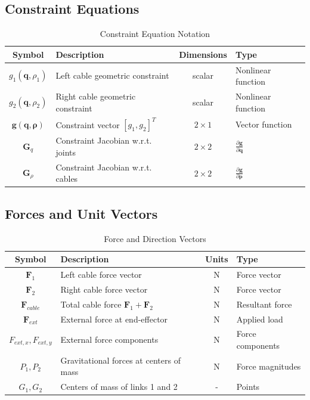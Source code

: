 \subsection{Constraint Equations}

\begin{table}[h!]
\centering
\caption{Constraint Equation Notation}
\begin{tabular}{|c|l|c|l|}
\hline
\textbf{Symbol} & \textbf{Description} & \textbf{Dimensions} & \textbf{Type} \\
\hline
$g_1(\bm{q}, \rho_1)$ & Left cable geometric constraint & scalar & Nonlinear function \\
$g_2(\bm{q}, \rho_2)$ & Right cable geometric constraint & scalar & Nonlinear function \\
$\bm{g}(\bm{q}, \bm{\rho})$ & Constraint vector $[g_1, g_2]^T$ & $2 \times 1$ & Vector function \\
$\bm{G}_q$ & Constraint Jacobian w.r.t. joints & $2 \times 2$ & $\frac{\partial \bm{g}}{\partial \bm{q}}$ \\
$\bm{G}_{\rho}$ & Constraint Jacobian w.r.t. cables & $2 \times 2$ & $\frac{\partial \bm{g}}{\partial \bm{\rho}}$ \\
\hline
\end{tabular}
\end{table}

\subsection{Forces and Unit Vectors}

\begin{table}[h!]
\centering
\caption{Force and Direction Vectors}
\begin{tabular}{|c|l|c|l|}
\hline
\textbf{Symbol} & \textbf{Description} & \textbf{Units} & \textbf{Type} \\
\hline
$\bm{F}_1$ & Left cable force vector & N & Force vector \\
$\bm{F}_2$ & Right cable force vector & N & Force vector \\
$\bm{F}_{cable}$ & Total cable force $\bm{F}_1 + \bm{F}_2$ & N & Resultant force \\
$\bm{F}_{ext}$ & External force at end-effector & N & Applied load \\
$F_{ext,x}, F_{ext,y}$ & External force components & N & Force components \\
$P_1, P_2$ & Gravitational forces at centers of mass & N & Force magnitudes \\
$G_1, G_2$ & Centers of mass of links 1 and 2 & - & Points \\
\hline
\end{tabular}
\end{table}

